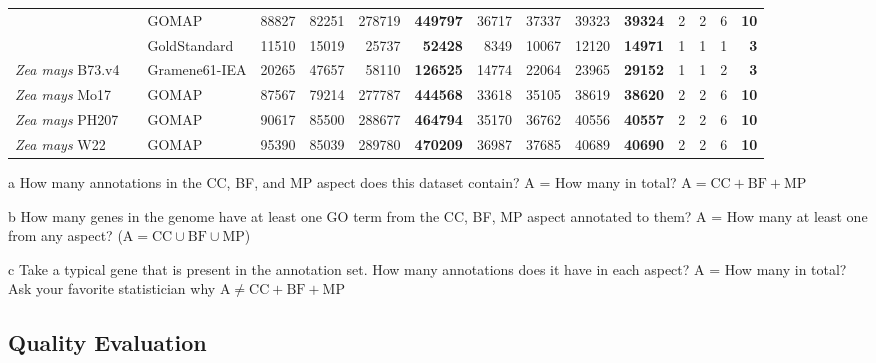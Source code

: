 \documentclass[utf8]{frontiersSCNS}
\begin{document}
\begin{table}[t]
{\begin{threeparttable}
\begin{tabular}{lrlrrr>{\bfseries}r|rrr>{\bfseries}r|rrr>{\bfseries}r}
 &  & GOMAP & 88827 & 82251 & 278719 & 449797 & 36717 & 37337 & 39323 & 39324 & 2 & 2 & 6 & 10\\

\rowcolor{gray!6}   &  & GoldStandard & 11510 & 15019 & 25737 & 52428 & 8349 & 10067 & 12120 & 14971 & 1 & 1 & 1 & 3\\

\multirow{-3}{*}{\raggedright\arraybackslash \textit{Zea mays} B73.v4} &  & Gramene61-IEA & 20265 & 47657 & 58110 & 126525 & 14774 & 22064 & 23965 & 29152 & 1 & 1 & 2 & 3\\

\rowcolor{gray!6}  \textit{Zea mays} Mo17 &  & GOMAP & 87567 & 79214 & 277787 & 444568 & 33618 & 35105 & 38619 & 38620 & 2 & 2 & 6 & 10\\

\textit{Zea mays} PH207 &  & GOMAP & 90617 & 85500 & 288677 & 464794 & 35170 & 36762 & 40556 & 40557 & 2 & 2 & 6 & 10\\

\rowcolor{gray!6}  \textit{Zea mays} W22 & \multirow{-27}{*}{\raggedleft\arraybackslash 100} & GOMAP & 95390 & 85039 & 289780 & 470209 & 36987 & 37685 & 40689 & 40690 & 2 & 2 & 6 & 10\\
\bottomrule
\end{tabular}
\begin{tablenotes}
\item[a] How many annotations in the CC, BF, and MP aspect does this dataset contain? A = How many in total? $\textrm{A} = \textrm{CC} + \textrm{BF} + \textrm{MP}$
\item[b] How many genes in the genome have at least one GO term from the CC, BF, MP aspect annotated to them? A = How many at least one from any aspect? ($\textrm{A} = \textrm{CC} \cup \textrm{BF} \cup \textrm{MP}$)
\item[c] Take a typical gene that is present in the annotation set. How many annotations does it have in each aspect? A = How many in total? Ask your favorite statistician why $\textrm{A} \neq \textrm{CC} + \textrm{BF} +\textrm{MP}$
\end{tablenotes}
\end{threeparttable}}
\end{table}

\hypertarget{quality-evaluation}{%
\subsection{Quality Evaluation}\label{quality-evaluation}}
\end{document}
